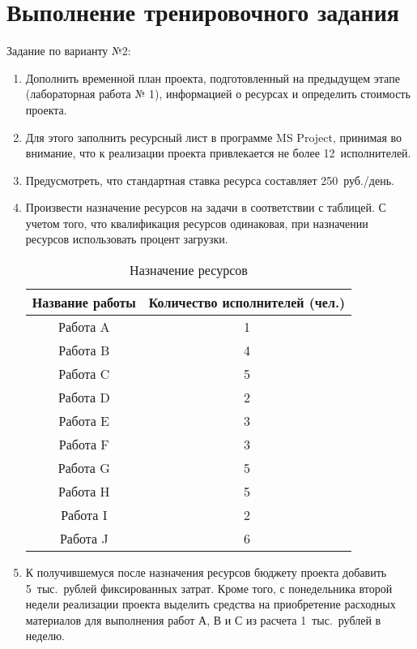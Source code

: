 \section{Выполнение тренировочного задания}

Задание по варианту №2:

\begin{enumerate}
    \item Дополнить временной план проекта, подготовленный на предыдущем этапе
    (лабораторная работа № 1), информацией о ресурсах и определить стоимость
    проекта.

    \item Для этого заполнить ресурсный лист в программе MS Project, принимая во
        внимание, что к реализации проекта привлекается не более
        12~исполнителей. 

    \item Предусмотреть, что стандартная ставка ресурса составляет
        250~руб./день.

    \item Произвести назначение ресурсов на задачи в соответствии с таблицей. С
        учетом того, что квалификация ресурсов одинаковая, при назначении
        ресурсов использовать процент загрузки. 

    {
    \captionsetup{format=hang,justification=raggedleft,
                  singlelinecheck=off,width=17cm}
    \begin{longtable}[Hc]{|c|c|}
    \caption{Назначение ресурсов}\\
        \hline
        Название работы & Количество исполнителей (чел.)\\
        \hline
        Работа A & 1\\
        \hline
        Работа B & 4\\
        \hline
        Работа C & 5\\
        \hline
        Работа D & 2\\
        \hline
        Работа E & 3\\
        \hline
        Работа F & 3\\
        \hline
        Работа G & 5\\
        \hline
        Работа H & 5\\
        \hline
        Работа I & 2\\
        \hline
        Работа J & 6\\
        \hline
    \end{longtable}
    }

    \item К получившемуся после назначения ресурсов бюджету проекта добавить
        5~тыс.~рублей фиксированных затрат. Кроме того, с понедельника второй
        недели реализации проекта выделить средства на приобретение расходных
        материалов для выполнения работ А, В и С из расчета 1~тыс.~рублей в
        неделю.
\end{enumerate}

